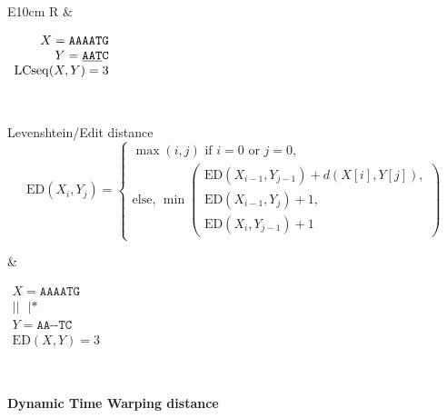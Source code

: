 \begin{table}
{\begin{tabularx}{\textwidth}{E{10cm}   R}
        &
        \hfill
        \begin{minipage}{4cm} \renewcommand{\arraystretch}{1}
            \hfill
            $\begin{array}{r}
                X= \mathrm{\texttt{AAAATG}}\\
                Y= \mathrm{\texttt{\underline{AAT}C}}\\
                \mathrm{LCseq}(X,Y)=3
            \end{array}$
        \end{minipage}\\
        \begin{minipage}{10cm} \renewcommand{\arraystretch}{1}
            Levenshtein/Edit distance \\
            $$ \mathrm{ED}(X_i,Y_j)= \left\{
                \begin{array}{l}
                    \max(i,j) \mbox{ if } i=0 \mbox{ or } j=0 {,} \\
                    \mbox{else, } \min 
                    \begin{pmatrix}
                        \mathrm{ED}(X_{i-1},Y_{j-1})+d(X[i],Y[j]), \\
                        \mathrm{ED}(X_{i-1},Y_j)+1, \\
                        \mathrm{ED}(X_i,Y_{j-1})+1
                    \end{pmatrix} 
                \end{array} \right. $$
                \vspace{0.5cm}
            \end{minipage}
            &
            \hfill
            \begin{minipage}{4cm} \renewcommand{\arraystretch}{1}
                \hfill
                $\begin{array}{r}
                    X= \mathrm{\texttt{AAAATG}}\\
                    \mathrm{\texttt{||~~|*}}\\
                    Y= \mathrm{\texttt{AA-{-}TC}}\\
                    \mathrm{ED}(X,Y)=3
                \end{array}$
        \end{minipage}\\
        \begin{minipage}{10cm} \renewcommand{\arraystretch}{1}
            \textbf{Dynamic Time Warping distance} \\ 

\end{minipage}
\end{tabularx}}
\end{table}
